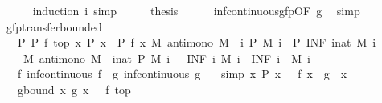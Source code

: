 \begin{isabellebody}
\ \ \ \ \isamarkupfalse%
\ {\isacharparenleft}induction\ i{\isacharsemicolon}\ simp{\isacharparenright}\isanewline
\ \ \isamarkupfalse%
\ \isamarkupfalse%
\ {\isacharquery}thesis\isanewline
\ \ \ \ \isamarkupfalse%
\ inf{\isacharunderscore}continuous{\isacharunderscore}gfp{\isacharbrackleft}OF\ g{\isacharbrackright}\ \isamarkupfalse%
\ simp\isanewline
{}\isamarkupfalse%
%
\endisatagproof
{\isafoldproof}%
%
\isadelimproof
\isanewline
%
\endisadelimproof
\isanewline
{}\isamarkupfalse%
\ gfp{\isacharunderscore}transfer{\isacharunderscore}bounded{\isacharcolon}\isanewline
\ \ \ P{\isacharcolon}\ {\isachardoublequoteopen}P\ {\isacharparenleft}f\ top{\isacharparenright}{\isachardoublequoteclose}\ {\isachardoublequoteopen}{\isasymAnd}x{\isachardot}\ P\ x\ {\isasymLongrightarrow}\ P\ {\isacharparenleft}f\ x{\isacharparenright}{\isachardoublequoteclose}\ {\isachardoublequoteopen}{\isasymAnd}M{\isachardot}\ antimono\ M\ {\isasymLongrightarrow}\ {\isacharparenleft}{\isasymAnd}i{\isachardot}\ P\ {\isacharparenleft}M\ i{\isacharparenright}{\isacharparenright}\ {\isasymLongrightarrow}\ P\ {\isacharparenleft}INF\ i{\isacharcolon}{\isacharcolon}nat{\isachardot}\ M\ i{\isacharparenright}{\isachardoublequoteclose}\isanewline
\ \ \ {\isasymalpha}{\isacharcolon}\ {\isachardoublequoteopen}{\isasymAnd}M{\isachardot}\ antimono\ M\ {\isasymLongrightarrow}\ {\isacharparenleft}{\isasymAnd}i{\isacharcolon}{\isacharcolon}nat{\isachardot}\ P\ {\isacharparenleft}M\ i{\isacharparenright}{\isacharparenright}\ {\isasymLongrightarrow}\ {\isasymalpha}\ {\isacharparenleft}INF\ i{\isachardot}\ M\ i{\isacharparenright}\ {\isacharequal}\ {\isacharparenleft}INF\ i{\isachardot}\ {\isasymalpha}\ {\isacharparenleft}M\ i{\isacharparenright}{\isacharparenright}{\isachardoublequoteclose}\isanewline
\ \ \ f{\isacharcolon}\ {\isachardoublequoteopen}inf{\isacharunderscore}continuous\ f{\isachardoublequoteclose}\ \ g{\isacharcolon}\ {\isachardoublequoteopen}inf{\isacharunderscore}continuous\ g{\isachardoublequoteclose}\isanewline
\ \ \ {\isacharbrackleft}simp{\isacharbrackright}{\isacharcolon}\ {\isachardoublequoteopen}{\isasymAnd}x{\isachardot}\ P\ x\ {\isasymLongrightarrow}\ {\isasymalpha}\ {\isacharparenleft}f\ x{\isacharparenright}\ {\isacharequal}\ g\ {\isacharparenleft}{\isasymalpha}\ x{\isacharparenright}{\isachardoublequoteclose}\isanewline
\ \ \ g{\isacharunderscore}bound{\isacharcolon}\ {\isachardoublequoteopen}{\isasymAnd}x{\isachardot}\ g\ x\ {\isasymle}\ {\isasymalpha}\ {\isacharparenleft}f\ top{\isacharparenright}{\isachardoublequoteclose}\isanewline

\end{isabellebody}

